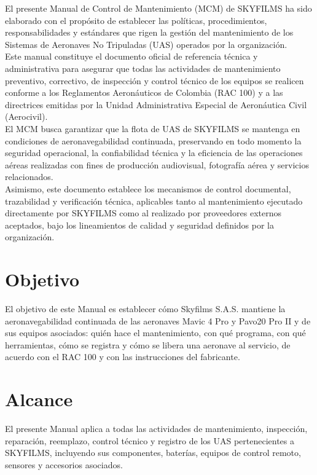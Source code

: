 
El presente Manual de Control de Mantenimiento (MCM) de SKYFILMS ha sido elaborado con el propósito de establecer las políticas, procedimientos, responsabilidades y estándares que rigen la gestión del mantenimiento de los Sistemas de Aeronaves No Tripuladas (UAS) operados por la organización.\\

Este manual constituye el documento oficial de referencia técnica y administrativa para asegurar que todas las actividades de mantenimiento preventivo, correctivo, de inspección y control técnico de los equipos se realicen conforme a los Reglamentos Aeronáuticos de Colombia (RAC 100) y a las directrices emitidas por la Unidad Administrativa Especial de Aeronáutica Civil (Aerocivil).\\

El MCM busca garantizar que la flota de UAS de SKYFILMS se mantenga en condiciones de aeronavegabilidad continuada, preservando en todo momento la seguridad operacional, la confiabilidad técnica y la eficiencia de las operaciones aéreas realizadas con fines de producción audiovisual, fotografía aérea y servicios relacionados.\\

Asimismo, este documento establece los mecanismos de control documental, trazabilidad y verificación técnica, aplicables tanto al mantenimiento ejecutado directamente por SKYFILMS como al realizado por proveedores externos aceptados, bajo los lineamientos de calidad y seguridad definidos por la organización.\\

\section{Objetivo}
El objetivo de este Manual es establecer cómo Skyfilms S.A.S. mantiene la aeronavegabilidad continuada de las aeronaves Mavic 4 Pro y Pavo20 Pro II y de sus equipos asociados: quién hace el mantenimiento, con qué programa, con qué herramientas, cómo se registra y cómo se libera una aeronave al servicio, de acuerdo con el RAC 100 y con las instrucciones del fabricante.

\section{Alcance}

El presente Manual aplica a todas las actividades de mantenimiento, inspección, reparación, reemplazo, control técnico y registro de los UAS pertenecientes a SKYFILMS, incluyendo sus componentes, baterías, equipos de control remoto, sensores y accesorios asociados.\\

